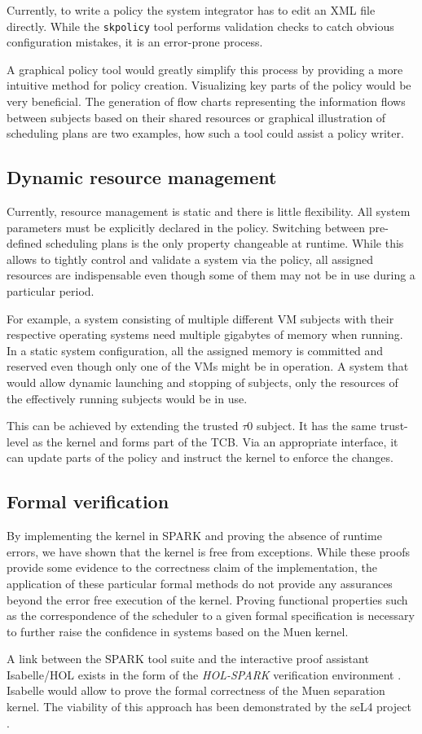 Currently, to write a policy the system integrator has to edit an XML file
directly. While the \texttt{skpolicy} tool performs validation checks to catch
obvious configuration mistakes, it is an error-prone process.

A graphical policy tool would greatly simplify this process by providing a more
intuitive method for policy creation. Visualizing key parts of the policy would
be very beneficial. The generation of flow charts representing the information
flows between subjects based on their shared resources or graphical illustration
of scheduling plans are two examples, how such a tool could assist a policy
writer.

\subsection{Dynamic resource management}
Currently, resource management is static and there is little flexibility. All
system parameters must be explicitly declared in the policy. Switching between
pre-defined scheduling plans is the only property changeable at runtime. While
this allows to tightly control and validate a system via the policy, all
assigned resources are indispensable even though some of them may not be in use
during a particular period.

For example, a system consisting of multiple different VM subjects with their
respective operating systems need multiple gigabytes of memory when running.
In a static system configuration, all the assigned memory is committed and
reserved even though only one of the VMs might be in operation. A system that
would allow dynamic launching and stopping of subjects, only the resources of
the effectively running subjects would be in use.

This can be achieved by extending the trusted $\tau$0 subject. It has the same
trust-level as the kernel and forms part of the TCB. Via an appropriate
interface, it can update parts of the policy and instruct the kernel to enforce
the changes.

\subsection{Formal verification}
By implementing the kernel in SPARK and proving the absence of runtime errors,
we have shown that the kernel is free from exceptions. While these proofs
provide some evidence to the correctness claim of the implementation, the
application of these particular formal methods do not provide any assurances
beyond the error free execution of the kernel. Proving functional properties
such as the correspondence of the scheduler to a given formal specification is
necessary to further raise the confidence in systems based on the Muen kernel.

A link between the SPARK tool suite and the interactive proof assistant
Isabelle/HOL exists in the form of the \emph{HOL-SPARK} verification
environment \cite{berghofer:OASIcs:2012:3587}. Isabelle would allow to prove
the formal correctness of the Muen separation kernel. The viability of this
approach has been demonstrated by the seL4 project \cite{Klein_EHACDEEKNSTW_09}.
